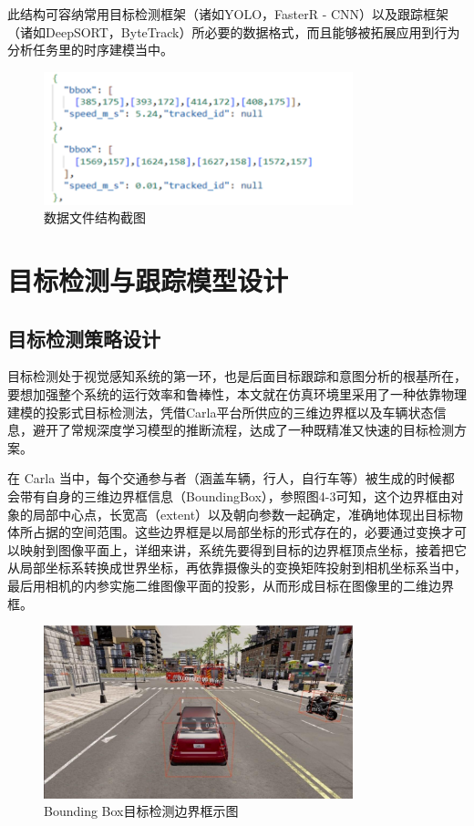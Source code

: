 此结构可容纳常用目标检测框架（诸如YOLO，FasterR - CNN）以及跟踪框架（诸如DeepSORT，ByteTrack）所必要的数据格式，而且能够被拓展应用到行为分析任务里的时序建模当中。

\begin{figure}[H]
    \centering
    \includegraphics[width=0.8\textwidth]{images/图8 数据文件结构截图.pdf}  %
    \caption{数据文件结构截图}
    \label{fig:example_image}  %
\end{figure}

\section{目标检测与跟踪模型设计}

\subsection{目标检测策略设计}

目标检测处于视觉感知系统的第一环，也是后面目标跟踪和意图分析的根基所在，要想加强整个系统的运行效率和鲁棒性，本文就在仿真环境里采用了一种依靠物理建模的投影式目标检测法，凭借Carla平台所供应的三维边界框以及车辆状态信息，避开了常规深度学习模型的推断流程，达成了一种既精准又快速的目标检测方案。

在 Carla 当中，每个交通参与者（涵盖车辆，行人，自行车等）被生成的时候都会带有自身的三维边界框信息（BoundingBox），参照图4-3可知，这个边界框由对象的局部中心点，长宽高（extent）以及朝向参数一起确定，准确地体现出目标物体所占据的空间范围。这些边界框是以局部坐标的形式存在的，必要通过变换才可以映射到图像平面上，详细来讲，系统先要得到目标的边界框顶点坐标，接着把它从局部坐标系转换成世界坐标，再依靠摄像头的变换矩阵投射到相机坐标系当中，最后用相机的内参实施二维图像平面的投影，从而形成目标在图像里的二维边界框。

\begin{figure}[H]
    \centering
    \includegraphics[width=0.8\textwidth]{images/图9 Bounding Box目标检测边界框示图.pdf}  %
    \caption{Bounding Box目标检测边界框示图}
    \label{fig:example_image}  %
\end{figure}

